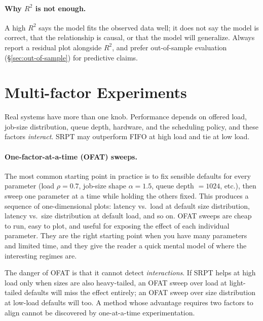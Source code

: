 \documentclass[11pt]{article}
\begin{document}
\paragraph{Why $R^2$ is not enough.} A high $R^2$ says the model fits the observed data well; it does not say the model is correct, that the relationship is causal, or that the model will generalize. Always report a residual plot alongside $R^2$, and prefer out-of-sample evaluation (\S\ref{sec:out-of-sample}) for predictive claims.

\section{Multi-factor Experiments}
\label{sec:multifactor}

Real systems have more than one knob. Performance depends on offered load, job-size distribution, queue depth, hardware, and the scheduling policy, and these factors \emph{interact}. SRPT may outperform FIFO at high load and tie at low load.

\paragraph{One-factor-at-a-time (OFAT) sweeps.} The most common starting point in practice is to fix sensible defaults for every parameter (load $\rho = 0.7$, job-size shape $\alpha = 1.5$, queue depth $= 1024$, etc.), then sweep one parameter at a time while holding the others fixed. This produces a sequence of one-dimensional plots: latency vs.\ load at default size distribution, latency vs.\ size distribution at default load, and so on. OFAT sweeps are cheap to run, easy to plot, and useful for exposing the effect of each individual parameter. They are the right starting point when you have many parameters and limited time, and they give the reader a quick mental model of where the interesting regimes are.

The danger of OFAT is that it cannot detect \emph{interactions}. If SRPT helps at high load only when sizes are also heavy-tailed, an OFAT sweep over load at light-tailed defaults will miss the effect entirely; an OFAT sweep over size distribution at low-load defaults will too. A method whose advantage requires two factors to align cannot be discovered by one-at-a-time experimentation.
\end{document}

